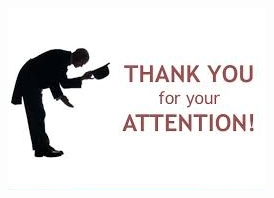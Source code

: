 \documentclass[12pt]{beamer}
\begin{document}
	\begin{frame}
		\begin{center}
		\includegraphics{thx}
		\end{center}
	\end{frame}
\end{document}
